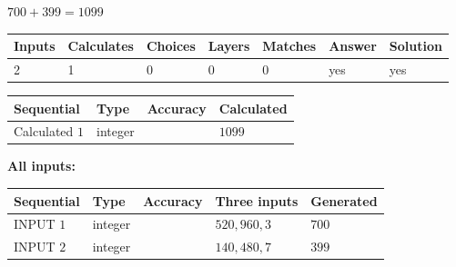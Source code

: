 \documentclass{ctexart}
\begin{document}
 

 
 
 
\noindent{}
 
 

$ %
700 +  %
399=   %
1099$
 
 
\noindent{}
 
 

 
   
   
   
   
\noindent\begin{tabular}{|l|l|l|l|l|l|l|}
 \hline
Inputs & Calculates & Choices & Layers & Matches & Answer & Solution \\ \hline
 2  & 
 1  & 
 0
  & 
 0  & 
 0  & 
  yes & 
  yes 
  \\ \hline
 \end{tabular}
   
   
   
   
\noindent{}
   
   
  
  
\noindent\begin{tabular}{|l|l|l|l|}
\hline
 Sequential & Type & Accuracy & Calculated \\ 
\hline
 
 
  Calculated $  1 $ & integer &  & 
  $ 1099 $ 
 \\  \hline  
 \end{tabular}
   
   
   
   
\noindent\vspace{0.1in}\hspace{-0.08in} {\textbf{\Large{All inputs: }}}
   
   
  
  
\noindent\begin{tabular}{|l|l|l|l|l|}
\hline
 Sequential & Type & Accuracy & Three inputs & Generated \\ 
\hline
 
 
  INPUT $  1 $ & integer &  & $
 520
 , 
 960
 , 
 3
 $ & $ 700 $ 
 \\  \hline  
 
 
  INPUT $  2 $ & integer &  & $
 140
 , 
 480
 , 
 7
 $ & $ 399 $ 
 \\  \hline  
 \end{tabular}
   
\end{document}
